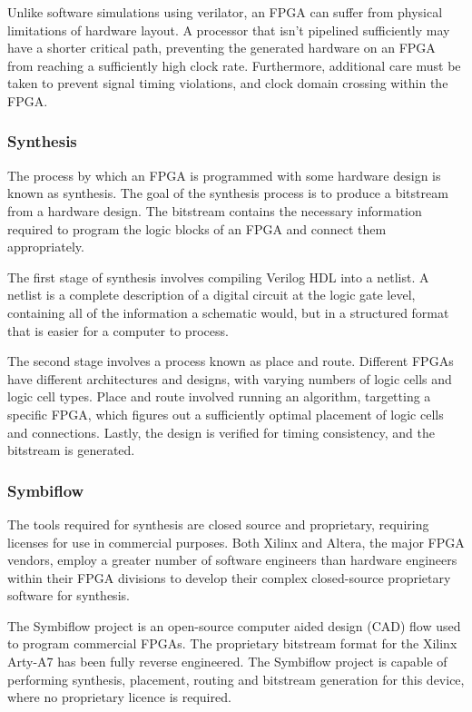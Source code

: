 \documentclass[a4paper,8pt]{report}
\begin{document}
Unlike software simulations using verilator, an
FPGA can suffer from physical limitations of hardware layout. A processor that
isn't pipelined sufficiently may have a shorter critical path, preventing the
generated hardware on an FPGA from reaching a sufficiently high clock rate.
Furthermore, additional care must be taken to prevent signal timing violations,
and clock domain crossing within the FPGA.




\subsubsection{Synthesis}
The process by which an FPGA is programmed with some hardware design is known
as synthesis. The goal of the synthesis process is to produce a bitstream from a
hardware design. The bitstream contains the necessary information required to
program the logic blocks of an FPGA and connect them appropriately.

The first stage of synthesis involves compiling Verilog HDL into a netlist.
A netlist is a complete description of a digital circuit at the logic gate
level, containing all of the information a schematic would, but in a structured
format that is easier for a computer to process.

The second stage involves a process known as place and route. Different FPGAs
have different architectures and designs, with varying numbers of logic cells
and logic cell types. Place and route involved running an algorithm, targetting
a specific FPGA, which figures out a sufficiently optimal placement of logic
cells and connections. Lastly, the design is verified for timing consistency,
and the bitstream is generated.

\subsubsection{Symbiflow}
The tools required for synthesis are closed source and proprietary, requiring
licenses for use in commercial purposes. Both Xilinx and Altera, the major FPGA
vendors, employ a greater number of software engineers than hardware engineers
within their FPGA divisions to develop their complex closed-source proprietary
software for synthesis.

The Symbiflow project is an open-source computer aided design (CAD) flow used to
program commercial FPGAs. The proprietary bitstream format for the Xilinx
Arty-A7 has been fully reverse engineered.
The Symbiflow project is capable of performing synthesis, placement, routing
and bitstream generation for this device, where no proprietary licence is required. 
\end{document}
